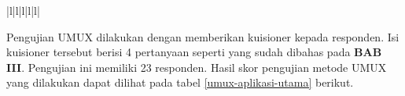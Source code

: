 \begin{table}[H]
\begin{tabular}{|l|l|l|l|l|}
		                                                                                                                                                                                                                                                                                                  \\ \hline
	\end{tabular}
\end{table}

\par Pengujian UMUX dilakukan dengan memberikan kuisioner kepada responden. Isi kuisioner tersebut berisi 4 pertanyaan seperti yang sudah dibahas pada \textbf{BAB III}. Pengujian ini memiliki 23 responden. Hasil skor pengujian metode UMUX yang dilakukan dapat dilihat pada tabel \ref{umux-aplikasi-utama} berikut.

